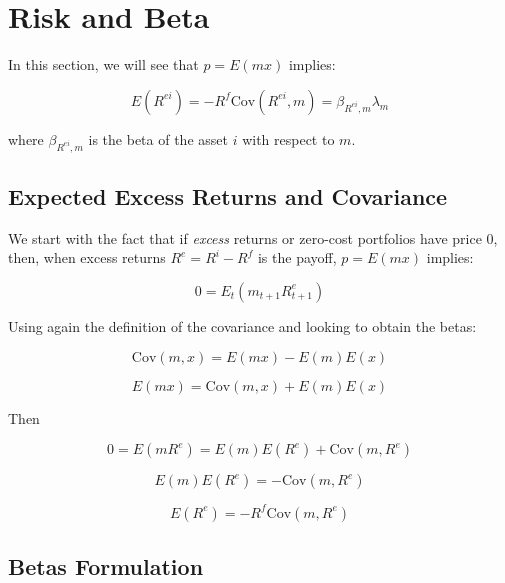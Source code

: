 \section{Risk and Beta}

In this section, we will see that $p = E(mx)$ implies:

\begin{equation}
E(R^{ei}) = -R^f \text{Cov}(R^{ei}, m) = \beta_{R^{ei},m} \lambda_m
\end{equation}

where $\beta_{R^{ei},m}$ is the beta of the asset $i$ with respect to $m$.

\subsection{Expected Excess Returns and Covariance}

We start with the fact that if \textit{excess} returns or 
zero-cost portfolios have price 0, then, when excess returns 
$R^e = R^i - R^f$
is the payoff, $p = E(mx)$ implies:

\begin{equation}
    0 = E_t(m_{t+1}R^{e}_{t+1})
\end{equation}

Using again the definition of the covariance and looking 
to obtain the betas:

\begin{equation}
    \text{Cov}(m, x) = E(mx) - E(m)E(x)
\end{equation}

\begin{equation}
    E(mx) = \text{Cov}(m, x) + E(m)E(x)
\end{equation}

Then 

\begin{equation}
    0 = E(mR^e) = E(m)E(R^e) + \text{Cov}(m, R^e)
\end{equation}

\begin{equation}
    E(m)E(R^e) = -\text{Cov}(m, R^e)
\end{equation}

\begin{equation}
    E(R^e) = - R^f \text{Cov}(m, R^e)
\end{equation}

\subsection{Betas Formulation}

